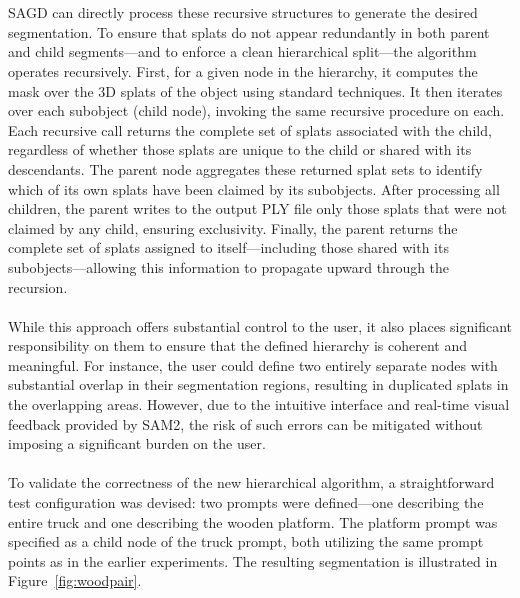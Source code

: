 \documentclass[12pt]{article}
\begin{document}
\\\\
SAGD can directly process these recursive structures to generate the desired segmentation. To ensure that splats do not appear redundantly in both parent and child segments—and to enforce a clean hierarchical split—the algorithm operates recursively. First, for a given node in the hierarchy, it computes the mask over the 3D splats of the object using standard techniques. It then iterates over each subobject (child node), invoking the same recursive procedure on each. Each recursive call returns the complete set of splats associated with the child, regardless of whether those splats are unique to the child or shared with its descendants. The parent node aggregates these returned splat sets to identify which of its own splats have been claimed by its subobjects. After processing all children, the parent writes to the output PLY file only those splats that were not claimed by any child, ensuring exclusivity. Finally, the parent returns the complete set of splats assigned to itself—including those shared with its subobjects—allowing this information to propagate upward through the recursion.
\\\\
While this approach offers substantial control to the user, it also places significant responsibility on them to ensure that the defined hierarchy is coherent and meaningful. For instance, the user could define two entirely separate nodes with substantial overlap in their segmentation regions, resulting in duplicated splats in the overlapping areas. However, due to the intuitive interface and real-time visual feedback provided by SAM2, the risk of such errors can be mitigated without imposing a significant burden on the user.
\\\\
To validate the correctness of the new hierarchical algorithm, a straightforward test configuration was devised: two prompts were defined—one describing the entire truck and one describing the wooden platform. The platform prompt was specified as a child node of the truck prompt, both utilizing the same prompt points as in the earlier experiments. The resulting segmentation is illustrated in Figure~\ref{fig:woodpair}.
\end{document}
